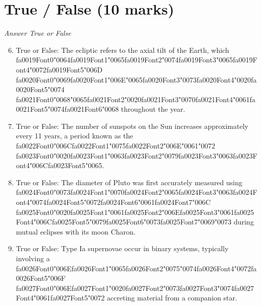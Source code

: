 \documentclass[12pt]{article}
\begin{document}
\section*{True / False (10 marks)}
\textit{Answer True or False}
\begin{enumerate}[label=\arabic*.]
\setcounter{enumi}{5}
\item True or False: The ecliptic refers to the axial tilt of the Earth, which {\csname fa0019Font0\endcsname\char"0064}{\csname fa0019Font1\endcsname\char"0065}{\csname fa0019Font2\endcsname\char"0074}{\csname fa0019Font3\endcsname\char"0065}{\csname fa0019Font4\endcsname\char"0072}{\csname fa0019Font5\endcsname\char"006D} {\csname fa0020Font0\endcsname\char"0069}{\csname fa0020Font1\endcsname\char"006E}{\char"0065}{\csname fa0020Font3\endcsname\char"0073}{\csname fa0020Font4\endcsname\char"0020}{\csname fa0020Font5\endcsname\char"0074} {\csname fa0021Font0\endcsname\char"0068}{\char"0065}{\csname fa0021Font2\endcsname\char"0020}{\csname fa0021Font3\endcsname\char"0070}{\csname fa0021Font4\endcsname\char"0061}{\csname fa0021Font5\endcsname\char"0074}{\csname fa0021Font6\endcsname\char"0068} throughout the year.
\item True or False: The number of sunspots on the Sun increases approximately every 11 years, a period known as the {\csname fa0022Font0\endcsname\char"006C}{\csname fa0022Font1\endcsname\char"0075}{\csname fa0022Font2\endcsname\char"006E}{\char"0061}{\char"0072} {\csname fa0023Font0\endcsname\char"0020}{\csname fa0023Font1\endcsname\char"0063}{\csname fa0023Font2\endcsname\char"0079}{\csname fa0023Font3\endcsname\char"0063}{\csname fa0023Font4\endcsname\char"006C}{\csname fa0023Font5\endcsname\char"0065}.
\item True or False: The diameter of Pluto was first accurately measured using {\csname fa0024Font0\endcsname\char"0073}{\csname fa0024Font1\endcsname\char"0070}{\csname fa0024Font2\endcsname\char"0065}{\csname fa0024Font3\endcsname\char"0063}{\csname fa0024Font4\endcsname\char"0074}{\csname fa0024Font5\endcsname\char"0072}{\csname fa0024Font6\endcsname\char"0061}{\csname fa0024Font7\endcsname\char"006C} {\csname fa0025Font0\endcsname\char"0020}{\csname fa0025Font1\endcsname\char"0061}{\csname fa0025Font2\endcsname\char"006E}{\csname fa0025Font3\endcsname\char"0061}{\csname fa0025Font4\endcsname\char"006C}{\csname fa0025Font5\endcsname\char"0079}{\csname fa0025Font6\endcsname\char"0073}{\csname fa0025Font7\endcsname\char"0069}{\char"0073} during mutual eclipses with its moon Charon.
\item True or False: Type Ia supernovae occur in binary systems, typically involving a {\csname fa0026Font0\endcsname\char"006E}{\csname fa0026Font1\endcsname\char"0065}{\csname fa0026Font2\endcsname\char"0075}{\char"0074}{\csname fa0026Font4\endcsname\char"0072}{\csname fa0026Font5\endcsname\char"006F} {\csname fa0027Font0\endcsname\char"006E}{\csname fa0027Font1\endcsname\char"0020}{\csname fa0027Font2\endcsname\char"0073}{\csname fa0027Font3\endcsname\char"0074}{\csname fa0027Font4\endcsname\char"0061}{\csname fa0027Font5\endcsname\char"0072} accreting material from a companion star.

\end{enumerate}
\end{document}
